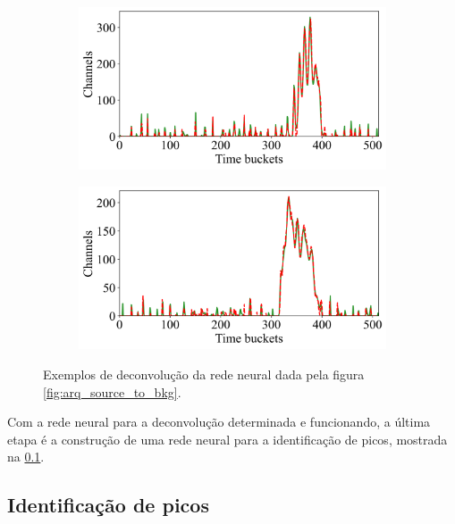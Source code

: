\documentclass[a4paper,12pt,oneside]{book}
\begin{document}
\begin{figure}[H]
\begin{subfigure}[b]{0.465\textwidth}
        \caption{}
        \label{subfig:std_ex2}
    \end{subfigure}
    \begin{subfigure}[b]{0.49\textwidth}
        \centering
        \includegraphics[scale=0.425]{figs/swbtd_3.png}
        \caption{}
        \label{subfig:std_ex3}
    \end{subfigure}%
    \hfill
    \begin{subfigure}[b]{0.465\textwidth}
        \centering
        \includegraphics[scale=0.425]{figs/swbtd_4.png}
        \caption{}
        \label{subfig:std_ex4}
    \end{subfigure}
\caption{Exemplos de deconvolução da rede neural dada pela figura \ref{fig:arq_source_to_bkg}.}
\label{fig:std_examples}
\end{figure}

\par Com a rede neural para a deconvolução determinada e funcionando, a última etapa é a construção de uma rede neural para a identificação de picos, mostrada na \ref{subsec:pulso_ml_peaks}.

\subsection{Identificação de picos}\label{subsec:pulso_ml_peaks}
\end{document}
